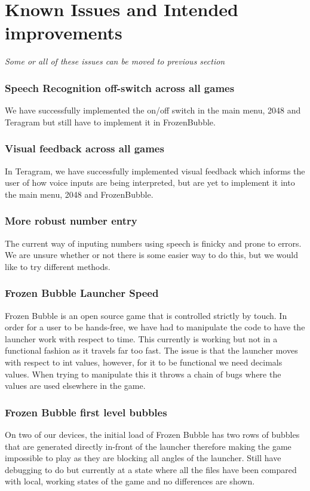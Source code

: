 \documentclass[11pt, oneside]{article}
\begin{document}
\pagebreak

\section{Known Issues and Intended improvements}

{\em Some or all of these issues can be moved to previous section }

\subsubsection*{Speech Recognition off-switch across all games}
We have successfully implemented the on/off switch in the main menu, 2048 and 
Teragram but still have to implement it in FrozenBubble.

\subsubsection*{Visual feedback across all games}
In Teragram, we have successfully implemented visual feedback which
informs the user of how voice inputs are being interpreted, but are
yet to implement it into the main menu, 2048 and FrozenBubble.


\subsubsection*{More robust number entry}
The current way of inputing numbers using speech is finicky and prone to
errors. We are unsure whether or not there is some easier way to do this,
but we would like to try different methods.


\subsubsection*{Frozen Bubble Launcher Speed}
Frozen Bubble is an open source game that is controlled strictly by touch. 
In order for a user to be hands-free, we have had to manipulate the code 
to have the launcher work with respect to time. This currently is working
but not in a functional fashion as it travels far too fast. The issue is 
that the launcher moves with respect to int values, however, for it to be 
functional we need decimals values. When trying to manipulate this it 
throws a chain of bugs where the values are used elsewhere in the game. 


\subsubsection*{Frozen Bubble first level bubbles}
On two of our devices, the initial load of Frozen Bubble has two rows of 
bubbles that are generated directly in-front of the launcher therefore making
the game impossible to play as they are blocking all angles of the launcher. 
Still have debugging to do but currently at a state where all the files have 
been compared with local, working states of the game and no differences are
shown.
\end{document}
